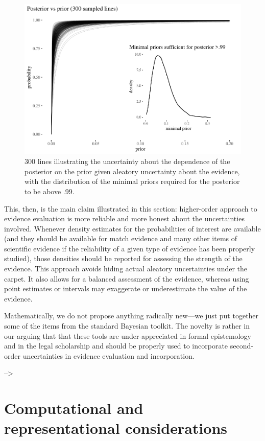 \documentclass[
  10pt,
  dvipsnames,enabledeprecatedfontcommands]{scrartcl}
\begin{document}
\begin{figure}[H]

\begin{center}\includegraphics[width=0.6\linewidth]{imprecision_philosophical_paper2_files/figure-latex/Figlines5-1} \end{center}

\caption{300 lines illustrating the uncertainty about the dependence of the posterior on the prior given aleatory uncertainty about the evidence, with the distribution of the minimal priors required for the posterior to be above .99.}

\label{Figlines}

\end{figure}

This, then, is the main claim illustrated in this section: higher-order
approach to evidence evaluation is more reliable and more honest about
the uncertainties involved. Whenever density estimates for the
probabilities of interest are available (and they should be available
for match evidence and many other items of scientific evidence if the
reliability of a given type of evidence has been properly studied),
those densities should be reported for assessing the strength of the
evidence. This approach avoids hiding actual aleatory uncertainties
under the carpet. It also allows for a balanced assessment of the
evidence, whereas using point estimates or intervals may exaggerate or
underestimate the value of the evidence.

Mathematically, we do not propose anything radically new---we just put
together some of the items from the standard Bayesian toolkit. The
novelty is rather in our arguing that that these tools are
under-appreciated in formal epistemology and in the legal scholarship
and should be properly used to incorporate second-order uncertainties in
evidence evaluation and incorporation.

--\textgreater{}

\section{Computational and representational
considerations}\label{computational-and-representational-considerations}
\end{document}
